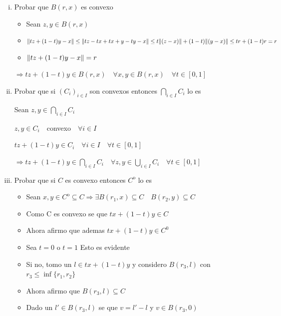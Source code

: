 \documentclass[12pt]{article}
\newcommand{\Ra}{\Rightarrow}
\DeclarePairedDelimiter{\norm}{\lVert}{\rVert}
\begin{document}
\begin{enumerate}[i)]
	\item Probar que $B(r,x)$ es convexo
		\begin{itemize}
			\item Sean $z,y \in B(r,x)$

			\item $ \norm{tz + (1-t)y -x }\leq \norm {tz - tx + tx +y -ty -x} \leq t\norm{(z-x)} + (1-t)\norm{(y-x)} \leq tr + (1-t)r = r$
	
			\item  $ \norm{tz + (1-t)y - x } = r$


		\end{itemize}
			 $\Ra tz + (1-t)y \in B(r,x) \quad \forall x,y \in B(r,x) \quad \forall t \in [0,1]$

		

	\item Probar que si $(C_{i})_{i \in I}$ son convexos entonces $ \bigcap_{i \in I} C_{i}$ lo es

		Sean $z,y \in \bigcap_{i \in I} C_{i} $

		$z,y \in C_{i} \quad $convexo$ \quad \forall i \in I $

		$ tz + (1-t)y \in C_{i} \quad \forall i \in I \quad \forall t \in [0,1]$

		$\Ra tz + (1-t)y \in \bigcap_{i \in I} C_{i} \quad \forall z,y \in \bigcup_{i \in I} C_{i} \quad \forall t \in [0,1]$
	\item Probar que si $C$ es convexo entonces $C^\mathrm{o}$ lo es
		
		\begin{itemize}
			\item Sean $x,y \in C^\mathrm{o} \subseteq C \Ra  \exists B(r_{1},x) \subseteq C \quad B(r_{2},y) \subseteq C $
			\item Como C es convexo se que $tx + (1-t)y \in C$

			\item Ahora afirmo que ademas $tx + (1-t)y \in C^\mathrm{0}$

			\item Sea $t=0$ o $t=1$ Esto es evidente

			\item Si no, tomo un $l \in tx + (1-t)y$ y considero $B(r_{3},l)$ con $r_{3} \leq \inf \{r_{1},r_{2}\}$

		 	\item Ahora afirmo que $B(r_{3},l) \subseteq C$

			\item Dado un $l' \in B(r_{3},l)$ se que $ v = l' - l$ y $ v \in B(r_{3},0)$


\end{itemize}
\end{enumerate}
\end{document}
